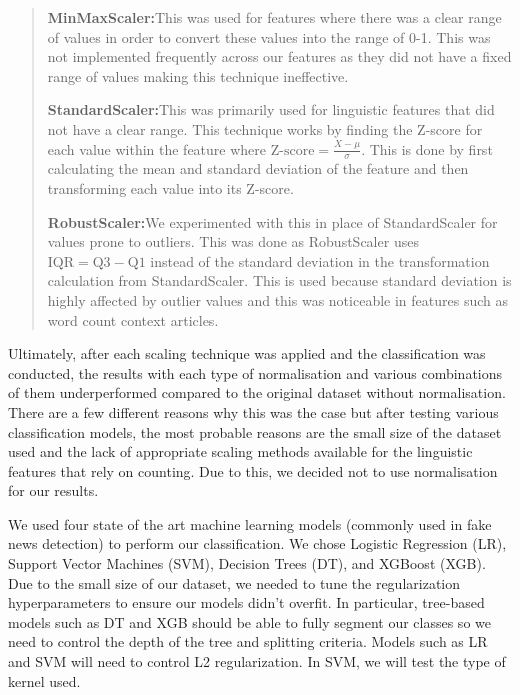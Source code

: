 \documentclass{article}
\begin{document}
\begin{quote}
  \textbf{MinMaxScaler:}\quad This was used for features where there was a clear range of values in order to convert these values into the range of 0-1. This was not implemented frequently across our features as they did not have a fixed range of values making this technique ineffective.

  \textbf{StandardScaler:}\quad This was primarily used for linguistic features that did not have a clear range. This technique works by finding the Z-score for each value within the feature where $\text{Z-score} = \frac{X - \mu}{\sigma}$. This is done by first calculating the mean and standard deviation of the feature and then transforming each value into its Z-score.

  \textbf{RobustScaler:}\quad We experimented with this in place of StandardScaler for values prone to outliers. This was done as RobustScaler uses $\text{IQR} = \text{Q3} - \text{Q1}$ instead of the standard deviation in the transformation calculation from StandardScaler. This is used because standard deviation is highly affected by outlier values and this was noticeable in features such as word count context articles.
\end{quote}

Ultimately, after each scaling technique was applied and the classification was conducted, the results with each type of normalisation and various combinations of them underperformed compared to the original dataset without normalisation. There are a few different reasons why this was the case but after testing various classification models, the most probable reasons are the small size of the dataset used and the lack of appropriate scaling methods available for the linguistic features that rely on counting. Due to this, we decided not to use normalisation for our results.


\label{section:machine-learning}

We used four state of the art machine learning models (commonly used in fake news detection) to perform our classification. We chose Logistic Regression (LR), Support Vector Machines (SVM), Decision Trees (DT), and XGBoost (XGB). Due to the small size of our dataset, we needed to tune the regularization hyperparameters to ensure our models didn't overfit. In particular, tree-based models such as DT and XGB should be able to fully segment our classes so we need to control the depth of the tree and splitting criteria. Models such as LR and SVM will need to control L2 regularization. In SVM, we will test the type of kernel used.
\end{document}
